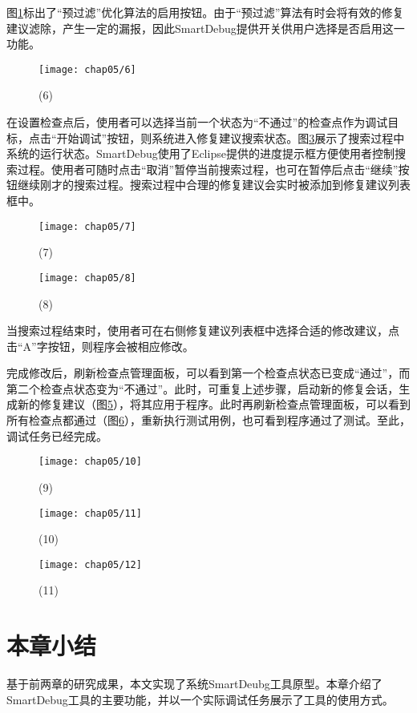 图\ref{fig:example-6}标出了“预过滤”优化算法的启用按钮。由于“预过滤”算法有时会将有效的修复建议滤除，产生一定的漏报，因此SmartDebug提供开关供用户选择是否启用这一功能。
\begin{figure}
	\centering
	\texttt{[image: chap05/6]}
	\caption{(6)}
	\label{fig:example-6}
\end{figure}
在设置检查点后，使用者可以选择当前一个状态为“不通过”的检查点作为调试目标，点击“开始调试”按钮，则系统进入修复建议搜索状态。图\ref{fig:example-8}展示了搜索过程中系统的运行状态。SmartDebug使用了Eclipse提供的进度提示框方便使用者控制搜索过程。使用者可随时点击“取消”暂停当前搜索过程，也可在暂停后点击“继续”按钮继续刚才的搜索过程。搜索过程中合理的修复建议会实时被添加到修复建议列表框中。
\begin{figure}
	\centering
	\texttt{[image: chap05/7]}
	\caption{(7)}
	\label{fig:example-7}
\end{figure}

\begin{figure}
	\centering
	\texttt{[image: chap05/8]}
	\caption{(8)}
	\label{fig:example-8}
\end{figure}
当搜索过程结束时，使用者可在右侧修复建议列表框中选择合适的修改建议，点击“A”字按钮，则程序会被相应修改。

完成修改后，刷新检查点管理面板，可以看到第一个检查点状态已变成“通过”，而第二个检查点状态变为“不通过”。此时，可重复上述步骤，启动新的修复会话，生成新的修复建议（图\ref{fig:example-11}），将其应用于程序。此时再刷新检查点管理面板，可以看到所有检查点都通过（图\ref{fig:example-12}），重新执行测试用例，也可看到程序通过了测试。至此，调试任务已经完成。

\begin{figure}
	\centering
	\texttt{[image: chap05/10]}
	\caption{(9)}
	\label{fig:example-10}
\end{figure}
\begin{figure}
	\centering
	\texttt{[image: chap05/11]}
	\caption{(10)}
	\label{fig:example-11}
\end{figure}
\begin{figure}
	\centering
	\texttt{[image: chap05/12]}
	\caption{(11)}
	\label{fig:example-12}
\end{figure}

\section{本章小结}

基于前两章的研究成果，本文实现了系统SmartDeubg工具原型。本章介绍了SmartDebug工具的主要功能，并以一个实际调试任务展示了工具的使用方式。